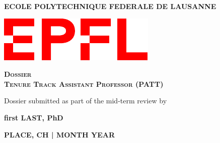 \documentclass[11pt, notitlepage]{report}
\begin{document}
\begin{titlepage}
	\centering
	{\textbf{ECOLE POLYTECHNIQUE FEDERALE DE LAUSANNE}} \par
	\vspace{1 cm}
    \vspace{1 cm}
	\includegraphics[scale=0.6]{Figures/Logo_EPFL.pdf}\par\vspace{1cm}
  
	\vspace{1cm}
	{\scshape\Large\textbf{Dossier \\ Tenure Track Assistant Professor (PATT)}\par}
	\vspace{1 cm}

    
    Dossier submitted as part of the mid-term review by
    \vspace{0.5 cm}
    
	{\large\textbf{first LAST, PhD}\par}
	

	\vspace{12 cm}
	{\large \textbf{PLACE, CH | MONTH YEAR}\par}
\end{titlepage}




{\hypersetup{linkcolor=black}
\tableofcontents
}




\end{document}
